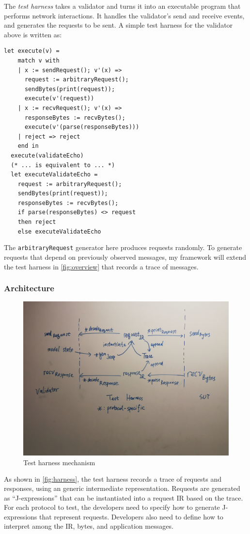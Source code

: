 \documentclass{article}
\newcommand{\ilc}[1]{\lstinline[style=customcoq]{#1}}
\theoremstyle{definition}
\begin{document}
The {\em test harness} takes a validator and turns it into an executable program
that performs network interactions.  It handles the validator's send and receive
events, and generates the requests to be sent.  A simple test harness for the
validator above is written as:
\begin{lstlisting}[style=customcoq]
  let execute(v) =
    match v with
    | x := sendRequest(); v'(x) =>
      request := arbitraryRequest();
      sendBytes(print(request));
      execute(v'(request))
    | x := recvRequest(); v'(x) =>
      responseBytes := recvBytes();
      execute(v'(parse(responseBytes)))
    | reject => reject
    end in
  execute(validateEcho)
  (* ... is equivalent to ... *)
  let executeValidateEcho =
    request := arbitraryRequest();
    sendBytes(print(request));
    responseBytes := recvBytes();
    if parse(responseBytes) <> request
    then reject
    else executeValidateEcho
\end{lstlisting}

The \ilc{arbitraryRequest} generator here produces requests randomly.  To
generate requests that depend on previously observed messages, my framework will
extend the test harness in \autoref{fig:overview} that records a trace of
messages.

\subsubsection{Architecture}
\begin{figure}
  \centering
  \includegraphics[width=.8\textwidth]{figures/harness}
  \caption{Test harness mechanism}
  \label{fig:harness}
\end{figure}

As shown in \autoref{fig:harness}, the test harness records a trace of requests
and responses, using an generic intermediate representation.  Requests are
generated as ``J-expressions'' that can be instantiated into a request IR based
on the trace.  For each protocol to test, the developers need to specify how to
generate J-expressions that represent requests.  Developers also need to define
how to interpret among the IR, bytes, and application messages.
\end{document}
